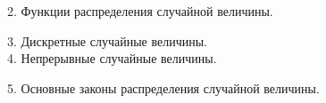 
2. Функции распределения случайной величины.


3. Дискретные случайные величины.  \\


4. Непрерывные случайные величины.


5. Основные законы распределения случайной величины. \\
